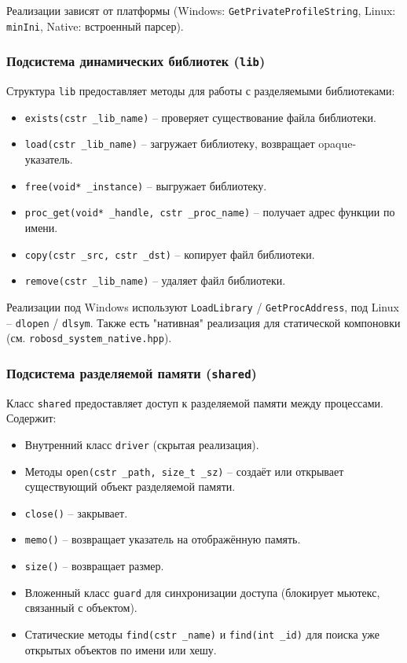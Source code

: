 \documentclass[a4paper,12pt]{article}
\begin{document}
Реализации зависят от платформы (Windows: \texttt{GetPrivateProfileString}, Linux: \texttt{minIni}, Native: встроенный парсер).

\subsubsection{Подсистема динамических библиотек (\texttt{lib})}

Структура \texttt{lib} предоставляет методы для работы с разделяемыми библиотеками:
\begin{itemize}
    \item \texttt{exists(cstr \_lib\_name)} -- проверяет существование файла библиотеки.
    \item \texttt{load(cstr \_lib\_name)} -- загружает библиотеку, возвращает opaque-указатель.
    \item \texttt{free(void* \_instance)} -- выгружает библиотеку.
    \item \texttt{proc\_get(void* \_handle, cstr \_proc\_name)} -- получает адрес функции по имени.
    \item \texttt{copy(cstr \_src, cstr \_dst)} -- копирует файл библиотеки.
    \item \texttt{remove(cstr \_lib\_name)} -- удаляет файл библиотеки.
\end{itemize}

Реализации под Windows используют \texttt{LoadLibrary} / \texttt{GetProcAddress}, под Linux -- \texttt{dlopen} / \texttt{dlsym}. Также есть "нативная" реализация для статической компоновки (см. \texttt{robosd\_system\_native.hpp}).

\subsubsection{Подсистема разделяемой памяти (\texttt{shared})}

Класс \texttt{shared} предоставляет доступ к разделяемой памяти между процессами. Содержит:
\begin{itemize}
    \item Внутренний класс \texttt{driver} (скрытая реализация).
    \item Методы \texttt{open(cstr \_path, size\_t \_sz)} -- создаёт или открывает существующий объект разделяемой памяти.
    \item \texttt{close()} -- закрывает.
    \item \texttt{memo()} -- возвращает указатель на отображённую память.
    \item \texttt{size()} -- возвращает размер.
    \item Вложенный класс \texttt{guard} для синхронизации доступа (блокирует мьютекс, связанный с объектом).
    \item Статические методы \texttt{find(cstr \_name)} и \texttt{find(int \_id)} для поиска уже открытых объектов по имени или хешу.
\end{itemize}
\end{document}
